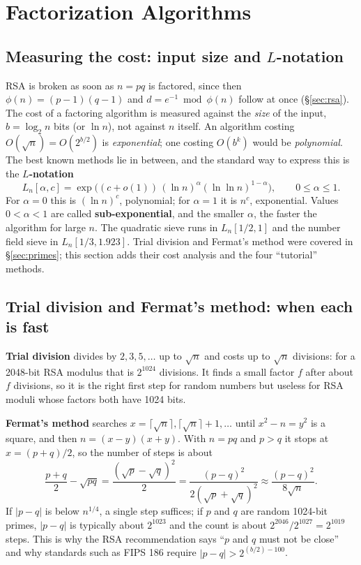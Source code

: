 \section{Factorization Algorithms}\label{sec:factoring}

\subsection{Measuring the cost: input size and $L$-notation \new}

RSA is broken as soon as $n = pq$ is factored, since then $\phi(n) = (p-1)(q-1)$ and $d = e^{-1} \bmod \phi(n)$ follow at once (\S\ref{sec:rsa}). The cost of a factoring algorithm is measured against the \emph{size} of the input, $b = \log_2 n$ bits (or $\ln n$), not against $n$ itself. An algorithm costing $O(\sqrt n) = O(2^{b/2})$ is \emph{exponential}; one costing $O(b^k)$ would be \emph{polynomial}. The best known methods lie in between, and the standard way to express this is the \textbf{$L$-notation}
\[
L_n[\alpha, c] = \exp\!\Big( (c + o(1))\, (\ln n)^{\alpha} (\ln\ln n)^{1-\alpha} \Big), \qquad 0 \le \alpha \le 1 .
\]
For $\alpha = 0$ this is $(\ln n)^{c}$, polynomial; for $\alpha = 1$ it is $n^{c}$, exponential. Values $0 < \alpha < 1$ are called \textbf{sub-exponential}, and the smaller $\alpha$, the faster the algorithm for large $n$. The quadratic sieve runs in $L_n[1/2, 1]$ and the number field sieve in $L_n[1/3, 1.923]$. Trial division and Fermat's method were covered in \S\ref{sec:primes}; this section adds their cost analysis and the four ``tutorial'' methods.

\subsection{Trial division and Fermat's method: when each is fast}
\textbf{Trial division} divides by $2, 3, 5, \dots$ up to $\sqrt n$ and costs up to $\sqrt n$ divisions: for a 2048-bit RSA modulus that is $2^{1024}$ divisions. It finds a small factor $f$ after about $f$ divisions, so it is the right first step for random numbers but useless for RSA moduli whose factors both have 1024 bits.

\textbf{Fermat's method} searches $x = \lceil\sqrt n\rceil, \lceil\sqrt n\rceil + 1, \dots$ until $x^2 - n = y^2$ is a square, and then $n = (x - y)(x + y)$. With $n = pq$ and $p > q$ it stops at $x = (p + q)/2$, so the number of steps is about
\[
\frac{p + q}{2} - \sqrt{pq} = \frac{(\sqrt p - \sqrt q)^2}{2} = \frac{(p - q)^2}{2(\sqrt p + \sqrt q)^2} \approx \frac{(p - q)^2}{8\sqrt n}.
\]
If $|p - q|$ is below $n^{1/4}$, a single step suffices; if $p$ and $q$ are random 1024-bit primes, $|p - q|$ is typically about $2^{1023}$ and the count is about $2^{2046}/2^{1027} = 2^{1019}$ steps. This is why the RSA recommendation says ``$p$ and $q$ must not be close'' and why standards such as FIPS 186 require $|p - q| > 2^{(b/2) - 100}$.

